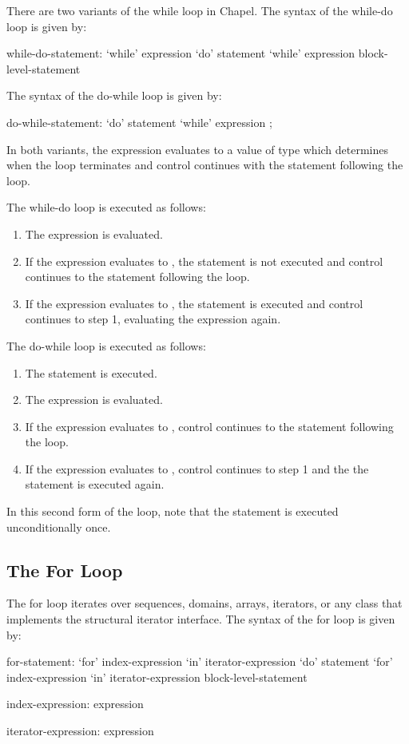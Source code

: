 There are two variants of the while loop in Chapel.  The syntax of the
while-do loop is given by:
\begin{syntax}
while-do-statement:
  `while' expression `do' statement
  `while' expression block-level-statement
\end{syntax}
The syntax of the do-while loop is given by:
\begin{syntax}
do-while-statement:
  `do' statement `while' expression ;
\end{syntax}
In both variants, the expression evaluates to a value of type 
which determines when the loop terminates and control continues with
the statement following the loop.

The while-do loop is executed as follows:
\begin{enumerate}
\item The expression is evaluated.
\item If the expression evaluates to , the statement is
  not executed and control continues to the statement following the
  loop.
\item If the expression evaluates to , the statement is
  executed and control continues to step 1, evaluating the expression
  again.
\end{enumerate}

The do-while loop is executed as follows:
\begin{enumerate}
\item The statement is executed.
\item The expression is evaluated.
\item If the expression evaluates to , control continues
  to the statement following the loop.
\item If the expression evaluates to , control continues to
  step 1 and the the statement is executed again.
\end{enumerate}
In this second form of the loop, note that the statement is executed
unconditionally once.

\subsection{The For Loop}
\label{The_For_Loop}

The for loop iterates over sequences, domains, arrays, iterators, or
any class that implements the structural iterator interface.  The
syntax of the for loop is given by:
\begin{syntax}
for-statement:
  `for' index-expression `in' iterator-expression `do' statement
  `for' index-expression `in' iterator-expression block-level-statement

index-expression:
  expression

iterator-expression:
  expression
\end{syntax}

